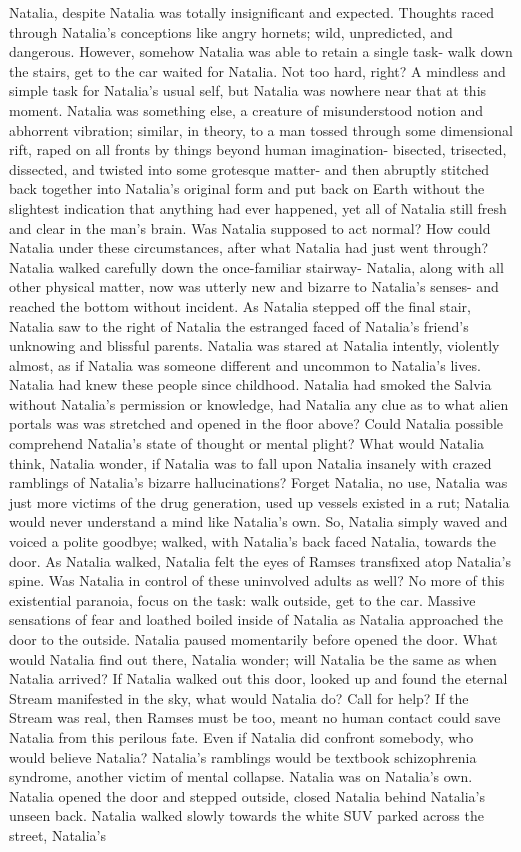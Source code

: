 \documentclass[12pt]{book}
\begin{document}
Natalia, despite Natalia was totally insignificant and expected. Thoughts raced through Natalia's conceptions like angry hornets; wild, unpredicted, and dangerous. However, somehow Natalia was able to retain a single task- walk down the stairs, get to the car waited for Natalia. Not too hard, right? A mindless and simple task for Natalia's usual self, but Natalia was nowhere near that at this moment. Natalia was something else, a creature of misunderstood notion and abhorrent vibration; similar, in theory, to a man tossed through some dimensional rift, raped on all fronts by things beyond human imagination- bisected, trisected, dissected, and twisted into some grotesque matter- and then abruptly stitched back together into Natalia's original form and put back on Earth without the slightest indication that anything had ever happened, yet all of Natalia still fresh and clear in the man's brain. Was Natalia supposed to act normal? How could Natalia under these circumstances, after what Natalia had just went through? Natalia walked carefully down the once-familiar stairway- Natalia, along with all other physical matter, now was utterly new and bizarre to Natalia's senses- and reached the bottom without incident. As Natalia stepped off the final stair, Natalia saw to the right of Natalia the estranged faced of Natalia's friend's unknowing and blissful parents. Natalia was stared at Natalia intently, violently almost, as if Natalia was someone different and uncommon to Natalia's lives. Natalia had knew these people since childhood. Natalia had smoked the Salvia without Natalia's permission or knowledge, had Natalia any clue as to what alien portals was was stretched and opened in the floor above? Could Natalia possible comprehend Natalia's state of thought or mental plight? What would Natalia think, Natalia wonder, if Natalia was to fall upon Natalia insanely with crazed ramblings of Natalia's bizarre hallucinations? Forget Natalia, no use, Natalia was just more victims of the drug generation, used up vessels existed in a rut; Natalia would never understand a mind like Natalia's own. So, Natalia simply waved and voiced a polite goodbye; walked, with Natalia's back faced Natalia, towards the door. As Natalia walked, Natalia felt the eyes of Ramses transfixed atop Natalia's spine. Was Natalia in control of these uninvolved adults as well? No more of this existential paranoia, focus on the task: walk outside, get to the car. Massive sensations of fear and loathed boiled inside of Natalia as Natalia approached the door to the outside. Natalia paused momentarily before opened the door. What would Natalia find out there, Natalia wonder; will Natalia be the same as when Natalia arrived? If Natalia walked out this door, looked up and found the eternal Stream manifested in the sky, what would Natalia do? Call for help? If the Stream was real, then Ramses must be too, meant no human contact could save Natalia from this perilous fate. Even if Natalia did confront somebody, who would believe Natalia? Natalia's ramblings would be textbook schizophrenia syndrome, another victim of mental collapse. Natalia was on Natalia's own. Natalia opened the door and stepped outside, closed Natalia behind Natalia's unseen back. Natalia walked slowly towards the white SUV parked across the street, Natalia's 
\end{document}
